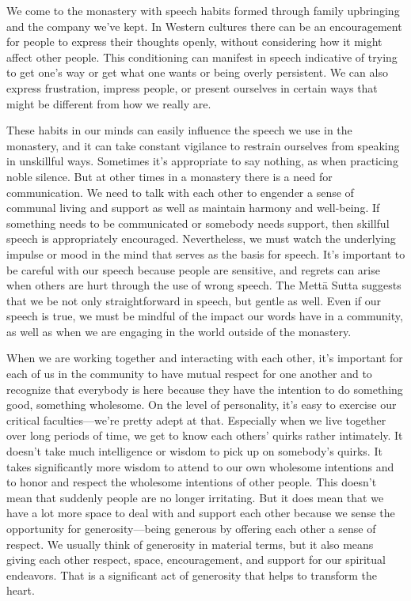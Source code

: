 We come to the monastery with speech habits formed through family 
upbringing and the company we've kept. In Western cultures there can be 
an encouragement for people to express their thoughts openly, without 
considering how it might affect other people. This conditioning can 
manifest in speech indicative of trying to get one's way or get what 
one wants or being overly persistent. We can also express frustration, 
impress people, or present ourselves in certain ways that might be 
different from how we really are.

These habits in our minds can easily influence the speech we use in the 
monastery, and it can take constant vigilance to restrain ourselves 
from speaking in unskillful ways. Sometimes it's appropriate to say 
nothing, as when practicing noble silence. But at other times in a 
monastery there is a need for communication. We need to talk with each 
other to engender a sense of communal living and support as well as 
maintain harmony and well-being. If something needs to be communicated 
or somebody needs support, then skillful speech is appropriately 
encouraged. Nevertheless, we must watch the underlying impulse or mood 
in the mind that serves as the basis for speech. It's important to be 
careful with our speech because people are sensitive, and regrets can 
arise when others are hurt through the use of wrong speech. The Mettā 
Sutta suggests that we be not only straightforward in speech, but 
gentle as well. Even if our speech is true, we must be mindful of the 
impact our words have in a community, as well as when we are engaging 
in the world outside of the monastery.


When we are working together and interacting with each other, it's 
important for each of us in the community to have mutual respect for 
one another and to recognize that everybody is here because they have 
the intention to do something good, something wholesome. On the level 
of personality, it's easy to exercise our critical faculties---we're 
pretty adept at that. Especially when we live together over long 
periods of time, we get to know each others' quirks rather intimately. 
It doesn't take much intelligence or wisdom to pick up on somebody's 
quirks. It takes significantly more wisdom to attend to our own 
wholesome intentions and to honor and respect the wholesome intentions 
of other people. This doesn't mean that suddenly people are no longer 
irritating. But it does mean that we have a lot more space to deal with 
and support each other because we sense the opportunity for 
generosity---being generous by offering each other a sense of respect. 
We usually think of generosity in material terms, but it also means 
giving each other respect, space, encouragement, and support for our 
spiritual endeavors. That is a significant act of generosity that helps 
to transform the heart.

